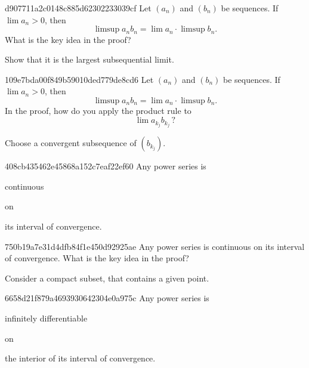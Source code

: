 \begin{note}{d907711a2c0148c885d62302233039cf}
    Let \({ (a_n) }\) and \({ (b_n) }\) be sequences.
    If \({ \lim a_n > 0 }\), then
    \[
        \limsup a_n b_n = \lim a_n \cdot \limsup b_n.
    \]
    What is the key idea in the proof?

    \begin{cloze}{1}
        Show that it is the largest subsequential limit.
    \end{cloze}
\end{note}

\begin{note}{109e7bda00f849b59010ded779de8cd6}
    Let \({ (a_n) }\) and \({ (b_n) }\) be sequences.
    If \({ \lim a_n > 0 }\), then
    \[
        \limsup a_n b_n = \lim a_n \cdot \limsup b_n.
    \]
    In the proof, how do you apply the product rule to
    \[
        \lim a_{k_j} b_{k_j}\,?
    \]

    \begin{cloze}{1}
        Choose a convergent subsequence of \({ (b_{k_j}) }\).
    \end{cloze}
\end{note}

\begin{note}{408cb435462e45868a152c7eaf22ef60}
    Any power series is \begin{icloze}{2}continuous\end{icloze} on \begin{icloze}{1}its interval of convergence.\end{icloze}
\end{note}

\begin{note}{750b19a7e31d4dfb84f1e450d92925ae}
    Any power series is continuous on its interval of convergence.
    What is the key idea in the proof?

    \begin{cloze}{1}
        Consider a compact subset, that contains a given point.
    \end{cloze}
\end{note}

\begin{note}{6658d21f879a4693930642304e0a975c}
    Any power series is \begin{icloze}{2}infinitely differentiable\end{icloze} on \begin{icloze}{1}the interior of its interval of convergence.\end{icloze}
\end{note}

